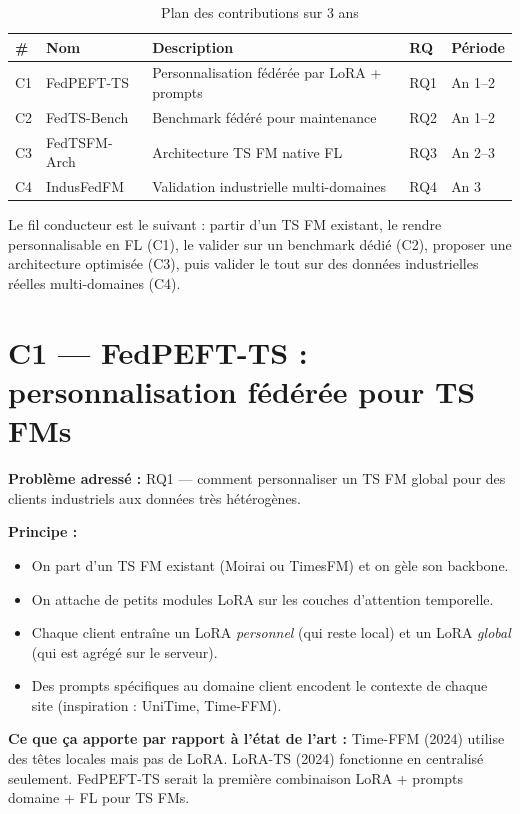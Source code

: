 \documentclass[12pt, a4paper]{report}
\begin{document}
\begin{table}[h!]
\centering
\caption{Plan des contributions sur 3 ans}
\label{tab:contributions}
\renewcommand{\arraystretch}{1.5}
\begin{tabularx}{\textwidth}{llXll}
\toprule
\# & Nom & Description & RQ & Période \\
\midrule
C1 & FedPEFT-TS & Personnalisation fédérée par LoRA + prompts & RQ1 & An 1--2 \\
C2 & FedTS-Bench & Benchmark fédéré pour maintenance & RQ2 & An 1--2 \\
C3 & FedTSFM-Arch & Architecture TS FM native FL & RQ3 & An 2--3 \\
C4 & IndusFedFM & Validation industrielle multi-domaines & RQ4 & An 3 \\
\bottomrule
\end{tabularx}
\end{table}

Le fil conducteur est le suivant : partir d'un TS FM existant, le rendre personnalisable
en FL (C1), le valider sur un benchmark dédié (C2), proposer une architecture optimisée
(C3), puis valider le tout sur des données industrielles réelles multi-domaines (C4).

\section{C1 — FedPEFT-TS : personnalisation fédérée pour TS FMs}

\textbf{Problème adressé :} RQ1 — comment personnaliser un TS FM global pour des
clients industriels aux données très hétérogènes.

\textbf{Principe :}
\begin{itemize}
  \item On part d'un TS FM existant (Moirai ou TimesFM) et on gèle son backbone.
  \item On attache de petits modules LoRA sur les couches d'attention temporelle.
  \item Chaque client entraîne un LoRA \textit{personnel} (qui reste local) et
  un LoRA \textit{global} (qui est agrégé sur le serveur).
  \item Des prompts spécifiques au domaine client encodent le contexte de chaque site
  (inspiration : UniTime, Time-FFM).
\end{itemize}

\textbf{Ce que ça apporte par rapport à l'état de l'art :} Time-FFM (2024) utilise
des têtes locales mais pas de LoRA. LoRA-TS (2024) fonctionne en centralisé seulement.
FedPEFT-TS serait la première combinaison LoRA + prompts domaine + FL pour TS FMs.
\end{document}
